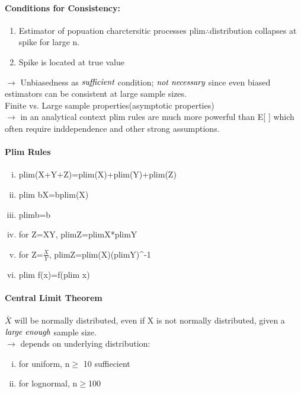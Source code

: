 \paragraph{Conditions for Consistency:}
\begin{enumerate}[(1)]
\item Estimator of popuation charctersitic processes plim$\therefore$distribution collapses at spike for large n.
\item Spike is located at true value
\end{enumerate}
$\rightarrow$ Unbiasedness as $\emph{sufficient}$ condition; $\emph{not necessary}$ since even biased estimators can be consistent at large sample sizes.\\
Finite vs. Large sample properties(asymptotic properties)\\
$\rightarrow$ in an analytical context plim rules are much more powerful than E[ ] which often require inddependence and other strong assumptions.\\

\paragraph{Plim Rules}
\begin{enumerate}[(i)]
\item plim(X+Y+Z)=plim(X)+plim(Y)+plim(Z)
\item plim bX=bplim(X)
\item plimb=b
\item for Z=XY, plimZ=plimX*plimY
\item for Z=$\frac{X}{Y}$, plimZ=plim(X)(plimY)^{-1}
\item plim f(x)=f(plim x)
\end{enumerate}

\paragraph{Central Limit Theorem}
$\bar{X}$ will be normally distributed, even if X is not normally distributed, given a $\emph{large enough}$ sample size.\\
$\rightarrow$ depends on underlying distribution:
\begin{enumerate}[(i)]
\item for uniform, n$\geq$ 10 suffiecient
\item for lognormal, n$\geq$100
\end{enumerate}



